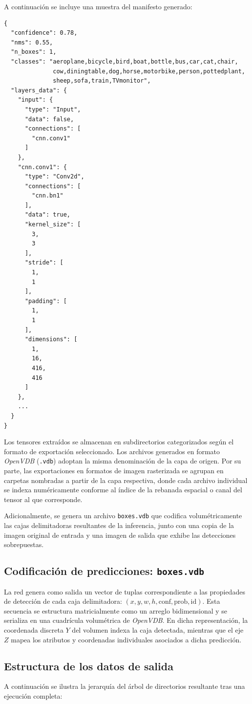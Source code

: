A continuación se incluye una muestra del manifesto generado:
\begin{verbatim}
{
  "confidence": 0.78,
  "nms": 0.55,
  "n_boxes": 1,
  "classes": "aeroplane,bicycle,bird,boat,bottle,bus,car,cat,chair,
              cow,diningtable,dog,horse,motorbike,person,pottedplant,
              sheep,sofa,train,TVmonitor",
  "layers_data": {
    "input": {
      "type": "Input",
      "data": false,
      "connections": [
        "cnn.conv1"
      ]
    },
    "cnn.conv1": {
      "type": "Conv2d",
      "connections": [
        "cnn.bn1"
      ],
      "data": true,
      "kernel_size": [
        3,
        3
      ],
      "stride": [
        1,
        1
      ],
      "padding": [
        1,
        1
      ],
      "dimensions": [
        1,
        16,
        416,
        416
      ]
    },
    ...
  }
}
\end{verbatim}

Los tensores extraídos se almacenan en subdirectorios categorizados según el formato de exportación seleccionado. 
Los archivos generados en formato \textit{OpenVDB} (\texttt{.vdb}) adoptan la misma denominación de la capa de origen. 
Por su parte, las exportaciones en formatos de imagen rasterizada se agrupan en carpetas nombradas a partir de la capa respectiva, 
donde cada archivo individual se indexa numéricamente conforme al índice de la rebanada espacial o canal del tensor al que corresponde.
\medskip

Adicionalmente, se genera un archivo \texttt{boxes.vdb} que codifica volumétricamente las cajas delimitadoras resultantes de la inferencia, 
junto con una copia de la imagen original de entrada y una imagen de salida que exhibe las detecciones sobrepuestas.

\subsection{Codificación de predicciones: \texttt{boxes.vdb}}
La red genera como salida un vector de tuplas correspondiente a las propiedades de detección de cada caja delimitadora: 
$(x, y, w, h, \text{conf}, \text{prob}, \text{id})$. Esta secuencia se estructura matricialmente como un arreglo bidimensional 
y se serializa en una cuadrícula volumétrica de \textit{OpenVDB}. En dicha representación, la coordenada discreta $Y$ del volumen 
indexa la caja detectada, mientras que el eje $Z$ mapea los atributos y coordenadas individuales asociados a dicha predicción.

\subsection{Estructura de los datos de salida}
A continuación se ilustra la jerarquía del árbol de directorios resultante tras una ejecución completa:

